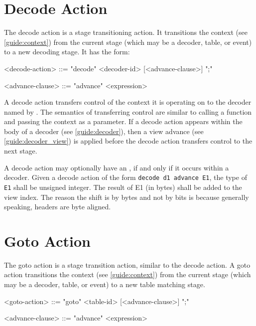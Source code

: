 \section{Decode Action} \label{guide:decode_action}

The decode action is a stage transitioning action. It transitions the context (see \ref{guide:context}) from the current stage (which may be a decoder, table, or event) to a new decoding stage. It has the form:

\begin{minip}
\begin{grammar}
<decode-action> ::=
"decode" <decoder-id> [<advance-clause>] ";"

<advance-clause> ::= "advance" <expression>
\end{grammar}
\end{minip}

A decode action transfers control of the context it is operating on to the decoder named by . The semantics of transferring control are similar to calling a function and passing the context as a parameter. If a decode action appears within the body of a decoder (see \ref{guide:decoder}), then a view advance (see \ref{guide:decoder_view}) is applied before the decode action transfers control to the next stage.

A decode action may optionally have an , if and only if it occurs within a decoder. Given a decode action of the form \texttt{decode d1 advance E1}, the type of \texttt{E1} shall be unsigned integer. The result of E1 (in bytes) shall be added to the view index. The reason the shift is by bytes and not by bits is because generally speaking, headers are byte aligned.

\section{Goto Action} \label{guide:goto}

The goto action is a stage transition action, similar to the decode action. A goto action transitions the context (see \ref{guide:context}) from the current stage (which may be a decoder, table, or event) to a new table matching stage.

\begin{minip}
\begin{grammar}
<goto-action> ::=
"goto" <table-id> [<advance-clause>] ";"

<advance-clause> ::= "advance" <expression>
\end{grammar}
\end{minip}

